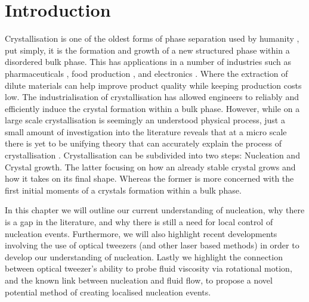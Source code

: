 \chapter{Introduction}
Crystallisation is one of the oldest forms of phase 
separation used by humanity \cite{Schoen1956}, put 
simply, it is the formation and growth of a new 
structured phase within a disordered bulk phase. 
This has applications in a number of industries such 
as pharmaceuticals \cite{Gao2017}, food production 
\cite{Hartel2002}, and electronics \cite{Myerson2002}. 
Where the extraction of dilute materials can help 
improve product quality while keeping production costs 
low. The industrialisation of crystallisation has 
allowed engineers to reliably and efficiently induce 
the crystal formation within a bulk phase. However, 
while on a large scale crystallisation is seemingly an 
understood physical process, just a small amount of 
investigation into the literature reveals that at a 
micro scale there is yet to be unifying theory that can 
accurately explain the process of crystallisation 
\cite{Fu2021}. Crystallisation can be subdivided into 
two steps: Nucleation and Crystal growth. The latter 
focusing on how an already stable crystal grows and how 
it takes on its final shape. Whereas the former is more 
concerned with the first initial moments of a crystals 
formation within a bulk phase.

In this chapter we will outline our current understanding 
of nucleation, why there is a gap in the literature, and why 
there is still a need for local control of nucleation events. 
Furthermore, we will also highlight recent developments 
involving the use of optical tweezers (and other laser based 
methods) in order to develop our understanding of nucleation. 
Lastly we highlight the connection between optical tweezer's 
ability to probe fluid viscosity via rotational motion, and 
the known link between nucleation and fluid flow, to propose 
a novel potential method of creating localised nucleation events.
 
